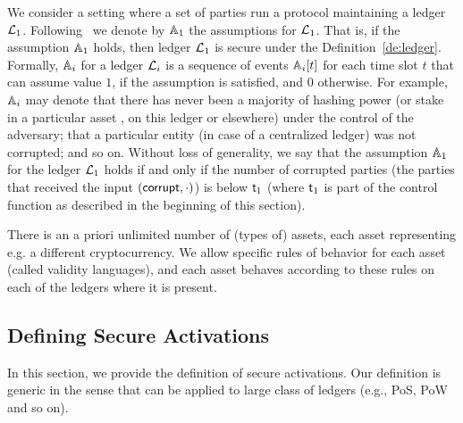 We consider a setting where a set of parties run a protocol maintaining a ledger $\mathcal{L}_1$. Following~\cite{sidechain} we denote by $\mathbb{A}_1$
the assumptions for $\mathcal{L}_1$.
 That is, if the assumption $\mathbb{A}_1$ holds, then ledger $\mathcal{L}_1$ is secure under the Definition~\ref{de:ledger}.
Formally, $\mathbb{A}_i$ for a ledger $\mathcal{L}_i$ is a sequence of events $\mathbb{A}_i[t]$ for each time slot $t$ that can assume value $1$, 
if the assumption is satisfied, and $0$ otherwise.
For example, $\mathbb{A}_i$ may denote that
there has never been a majority of hashing power (or stake in a particular
asset , on this ledger or elsewhere) under the control of the adversary; that a
particular entity (in case of a centralized ledger) was not corrupted; and so
on.
Without loss of generality, we say that the assumption $\mathbb{A}_1$ for the ledger $\mathcal{L}_1$ holds if and only if the number of corrupted parties (the parties
that received the input $(\mathsf{corrupt}, \cdot)$) is below $\mathsf{t}_1$ (where $\mathsf{t}_1$ is part of the control function as described in the beginning 
of this section).


There is an a priori unlimited number of (types of) assets, each asset representing e.g. a different cryptocurrency. We allow specific rules of behavior for each asset (called validity languages), and each asset behaves according to these rules on each of the ledgers where it is present.





\subsection{Defining Secure Activations}
In this section, we provide the definition of secure activations. Our definition is generic in the sense that can be applied to large class of ledgers 
(e.g., PoS, PoW and so on).

